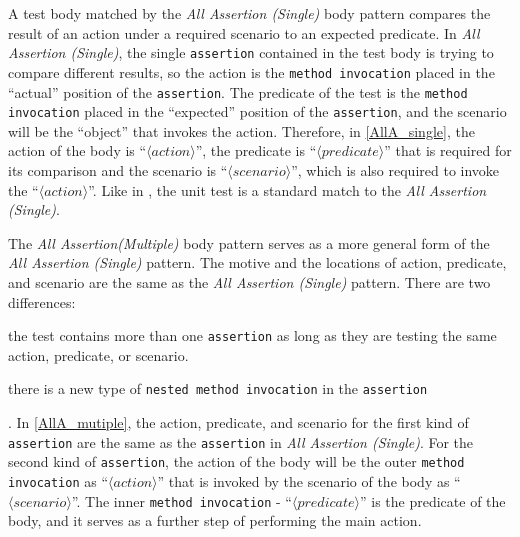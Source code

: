 \documentclass[proposal.tex]{subfiles}
\begin{document}
\begin{description}
A test body matched by the \textit{All Assertion (Single)} body pattern compares the result of an action under a required scenario to an expected predicate.
%
In \textit{All Assertion (Single)}, the single \texttt{assertion} contained in the test body is trying to compare different results, so the action is the \texttt{method invocation} placed in the \enquote{actual} position of the \texttt{assertion}.
%
The predicate of the test is the \texttt{method invocation} placed in the \enquote{expected} position of the \texttt{assertion}, and the scenario will be the \enquote{object} that invokes the action. 
%
Therefore, in \cref{AllA_single}, the action of the body is \enquote{$\langle action \rangle$}, the predicate is \enquote{$\langle predicate \rangle$} that is required for its comparison and the scenario is \enquote{$\langle scenario \rangle$}, which is also required to invoke the \enquote{$\langle action \rangle$}.
%
Like in , the unit test is a standard match to the \textit{All Assertion (Single)}.


\item[All Assertion (Multiple)] 


The \textit{All Assertion(Multiple)} body pattern serves as a more general form of the \textit{All Assertion (Single)} pattern.
%
The motive and the locations of action, predicate, and scenario are the same as the \textit{All Assertion (Single)} pattern.
%
There are two differences:
\begin{enumerate*}
    \item the test contains more than one \texttt{assertion} as long as they are testing the same action, predicate, or scenario.
    \item there is a new type of \texttt{nested method invocation} in the \texttt{assertion}
\end{enumerate*}.
%
In \cref{AllA_mutiple}, the action, predicate, and scenario for the first kind of \texttt{assertion} are the same as the \texttt{assertion} in \textit{All Assertion (Single)}.
%
For the second kind of \texttt{assertion}, the action of the body will be the outer \texttt{method invocation} as \enquote{$\langle action \rangle$} that is invoked by the scenario of the body as \enquote{$\langle scenario \rangle$}.
%
The inner \texttt{method invocation} - \enquote{$\langle predicate \rangle$} is the predicate of the body, and it serves as a further step of performing the main action.


\item[Normal (Restricted)] 



\end{description}
\end{document}
